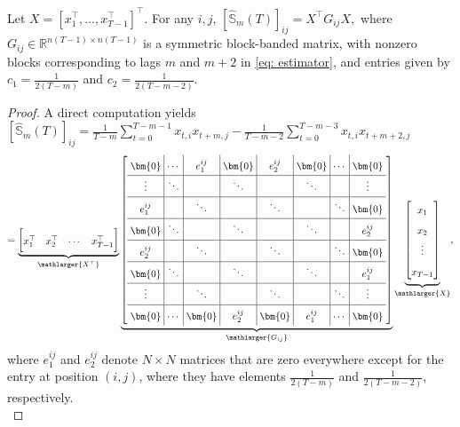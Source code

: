 \documentclass[11pt]{article}
\begin{document}
\begin{lemma}
\label{lem:quadratic_form}
Let $X=[x_1^\top,\dots,x_{T-1}^\top]^\top$. For any $i,j$,
\(
[\hat{\mathbb{S}}_m(T)]_{ij}=X^\top G_{ij}X,
\)
where $G_{ij}\in\mathbb{R}^{n(T-1)\times n(T-1)}$ is a symmetric block-banded matrix, with nonzero blocks corresponding to lags $m$
and $m+2$ in \eqref{eq: estimator}, and entries given by $c_1=\frac{1}{2(T-m)}$ and $c_2=\frac{1}{2(T-m-2)}$.
\end{lemma}
\begin{proof}
A direct computation yields $[\hat{\mathbb{S}}_m(T)]_{ij} = \frac{1}{T-m}\sum_{t=0}^{T-m-1}x_{t,i}x_{t+m,j} - \frac{1}{T-m-2}\sum_{t=0}^{T-m-3}{x}_{t,i}{x}_{t+m+2,j}$
\setcounter{MaxMatrixCols}{8}
\begin{align*}
    = \underbrace{\begin{bmatrix} x_1^\top & x_2^\top & \cdots & x_{T-1}^\top \end{bmatrix}}_{\mathlarger{X^\top}}
    \setlength\arraycolsep{3pt}
    \underbrace{
    \begingroup\renewcommand*{\arraystretch}{1.7}
    \begin{bmatrix} \begin{array}{c|c|c|c|c|c|c|c} 
    \bm{0} & \cdots & e_1^{ij} & \bm{0} & e_2^{ij} & \bm{0} & \cdots & \bm{0} \\ \hline \vdots & \ddots & & \ddots & & \ddots & & \vdots \\ \hline e_1^{ij} & & \ddots & & \ddots & & \ddots & \bm{0} \\ \hline \bm{0} & \ddots & & \ddots & & \ddots & & e_2^{ij} \\ \hline e_2^{ij} & & \ddots & & \ddots & & \ddots & \bm{0} \\ \hline \bm{0} & \ddots & & \ddots & & \ddots & & e_1^{ij} \\ \hline \vdots & & \ddots & & \ddots & & \ddots & \vdots \\ \hline \bm{0} & \cdots & \bm{0} & e_2^{ij} & \bm{0} & e_1^{ij} & \cdots & \bm{0} 
    \end{array} 
    \end{bmatrix}
    \endgroup}_{\mathlarger{G_{ij}}}  
    \underbrace{\begin{bmatrix}
       x_{1} \\x_{2}\\  \vdots \\ x_{T-1}  
    \end{bmatrix} }_{\mathlarger{X}},
\end{align*}
where $e_1^{ij}$ and $e_2^{ij}$
denote $N\times N$ matrices that are zero everywhere except for the entry at position $(i,j)$, where they have elements $\frac{1}{2(T-m)}$ and $\frac{1}{2(T-m-2)}$, respectively. \\
\end{proof}
\end{document}

